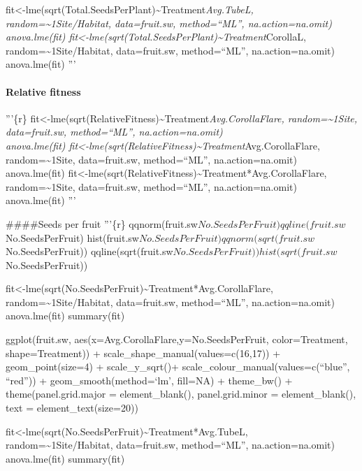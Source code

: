 \documentclass[]{article}
\let\oldparagraph\paragraph
\renewcommand{\paragraph}[1]{\oldparagraph{#1}\mbox{}}
\begin{document}
fit\textless{}-lme(sqrt(Total.SeedsPerPlant)\textasciitilde{}Treatment\emph{Avg.TubeL,
random=\textasciitilde{}1\textbar{}Site/Habitat, data=fruit.sw,
method=``ML'', na.action=na.omit)\\
anova.lme(fit)
fit\textless{}-lme(sqrt(Total.SeedsPerPlant)\textasciitilde{}Treatment}CorollaL,
random=\textasciitilde{}1\textbar{}Site/Habitat, data=fruit.sw,
method=``ML'', na.action=na.omit)\\
anova.lme(fit) '''

\hypertarget{relative-fitness}{%
\paragraph{Relative fitness}\label{relative-fitness}}

'''\{r\}
fit\textless{}-lme(sqrt(RelativeFitness)\textasciitilde{}Treatment\emph{Avg.CorollaFlare,
random=\textasciitilde{}1\textbar{}Site, data=fruit.sw, method=``ML'',
na.action=na.omit)\\
anova.lme(fit)
fit\textless{}-lme(sqrt(RelativeFitness)\textasciitilde{}Treatment}Avg.CorollaFlare,
random=\textasciitilde{}1\textbar{}Site, data=fruit.sw, method=``ML'',
na.action=na.omit)\\
anova.lme(fit)
fit\textless{}-lme(sqrt(RelativeFitness)\textasciitilde{}Treatment*Avg.CorollaFlare,
random=\textasciitilde{}1\textbar{}Site, data=fruit.sw, method=``ML'',
na.action=na.omit)\\
anova.lme(fit) '''

\#\#\#\#Seeds per fruit '''\{r\}
qqnorm(fruit.sw\(No.SeedsPerFruit) qqline(fruit.sw\)No.SeedsPerFruit)
hist(fruit.sw\(No.SeedsPerFruit) qqnorm(sqrt(fruit.sw\)No.SeedsPerFruit))
qqline(sqrt(fruit.sw\(No.SeedsPerFruit)) hist(sqrt(fruit.sw\)No.SeedsPerFruit))

fit\textless{}-lme(sqrt(No.SeedsPerFruit)\textasciitilde{}Treatment*Avg.CorollaFlare,
random=\textasciitilde{}1\textbar{}Site/Habitat, data=fruit.sw,
method=``ML'', na.action=na.omit)\\
anova.lme(fit) summary(fit)

ggplot(fruit.sw, aes(x=Avg.CorollaFlare,y=No.SeedsPerFruit,
color=Treatment, shape=Treatment)) +
scale\_shape\_manual(values=c(16,17)) + geom\_point(size=4) +
scale\_y\_sqrt()+ scale\_colour\_manual(values=c(``blue'', ``red'')) +
geom\_smooth(method=`lm', fill=NA) + theme\_bw() +
theme(panel.grid.major = element\_blank(), panel.grid.minor =
element\_blank(), text = element\_text(size=20))

fit\textless{}-lme(sqrt(No.SeedsPerFruit)\textasciitilde{}Treatment*Avg.TubeL,
random=\textasciitilde{}1\textbar{}Site/Habitat, data=fruit.sw,
method=``ML'', na.action=na.omit)\\
anova.lme(fit) summary(fit)
\end{document}
